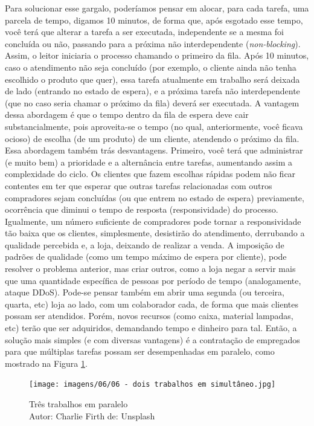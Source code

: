 Para solucionar esse gargalo, poderíamos pensar em alocar, para cada
tarefa, uma parcela de tempo, digamos 10 minutos, de forma que, após
esgotado esse tempo, você terá que alterar a tarefa a ser executada,
independente se a mesma foi concluída ou não, passando para a próxima
não interdependente (\emph{non-blocking}). Assim, o leitor iniciaria o
processo chamando o primeiro da fila. Após 10 minutos, caso o
atendimento não seja concluído (por exemplo, o cliente ainda não tenha
escolhido o produto que quer), essa tarefa atualmente em trabalho será
deixada de lado (entrando no estado de espera), e a próxima tarefa não
interdependente (que no caso seria chamar o próximo da fila) deverá ser
executada. A vantagem dessa abordagem é que o tempo dentro da fila de
espera deve cair substancialmente, pois aproveita-se o tempo (no qual,
anteriormente, você ficava ocioso) de escolha (de um produto) de um
cliente, atendendo o próximo da fila.
Essa abordagem também trás desvantagens. Primeiro, você terá que
administrar (e muito bem) a prioridade e a alternância entre tarefas,
aumentando assim a complexidade do ciclo. Os clientes que fazem escolhas
rápidas podem não ficar contentes em ter que esperar que outras tarefas
relacionadas com outros compradores sejam concluídas (ou que entrem no
estado de espera) previamente, ocorrência que diminui o tempo de
resposta (responsividade) do processo. Igualmente, um número suficiente
de compradores pode tornar a responsividade tão baixa que os clientes,
simplesmente, desistirão do atendimento, derrubando a qualidade
percebida e, a loja, deixando de realizar a venda. A imposição de
padrões de qualidade (como um tempo máximo de espera por cliente), pode
resolver o problema anterior, mas criar outros, como a loja negar a
servir mais que uma quantidade específica de pessoas por período de
tempo (analogamente, ataque DDoS).
Pode-se pensar também em abrir uma segunda (ou terceira, quarta, etc)
loja ao lado, com um colaborador cada, de forma que mais clientes possam
ser atendidos. Porém, novos recursos (como caixa, material lampadas,
etc) terão que ser adquiridos, demandando tempo e dinheiro para tal.
Então, a solução mais simples (e com diversas vantagens) é a contratação
de empregados para que múltiplas tarefas possam ser desempenhadas em
paralelo, como mostrado na Figura \ref{fig:Três trabalhos em paralelo}.

\begin{figure}[h!]
\centering
\texttt{[image: imagens/06/06 - dois trabalhos em simultâneo.jpg]}
\caption{Três trabalhos em paralelo   \\
Autor: Charlie Firth de: Unsplash \\}
\label{fig:Três trabalhos em paralelo}
\end{figure}


